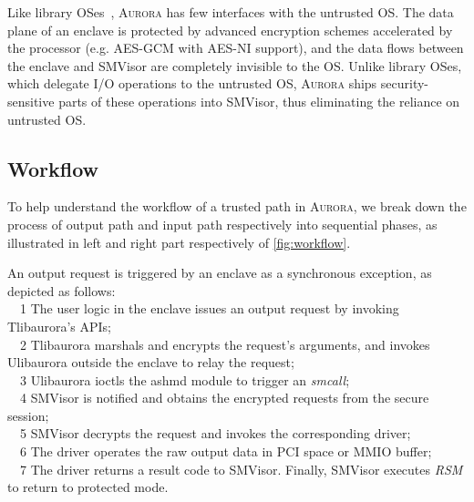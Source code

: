 Like library OSes~\cite{DBLP:journals/tocs/BaumannPH15, DBLP:conf/usenix/TsaiPV17, shinde_panoply:_2017}, \textsc{Aurora} has few interfaces with the untrusted OS. %
The data plane of an enclave is protected by advanced encryption schemes accelerated by the processor (e.g. AES-GCM with AES-NI support), and the data flows between the enclave and SMVisor are completely invisible to the OS. Unlike library OSes, which delegate I/O operations to the untrusted OS, \textsc{Aurora} ships security-sensitive parts of these operations into SMVisor, thus eliminating the reliance on untrusted OS.

\subsection{Workflow}\label{workflow}
To help understand the workflow of a trusted path in \textsc{Aurora}, we break down the process of output path and input path respectively into sequential phases, as illustrated in left and right part respectively of \autoref{fig:workflow}.

An output request is triggered by an enclave as a synchronous exception, as depicted as follows:\\
~~\textcircled{\footnotesize{1}} The user logic in the enclave issues an output request by invoking  Tlibaurora's APIs;\\
~~\textcircled{\footnotesize{2}} Tlibaurora marshals and encrypts the request's arguments, and invokes Ulibaurora outside the enclave to relay the request;\\ %
~~\textcircled{\footnotesize{3}} Ulibaurora ioctls the ashmd module to trigger an \textit{smcall};\\
~~\textcircled{\footnotesize{4}} SMVisor is notified and obtains the encrypted requests from the secure session;\\
~~\textcircled{\footnotesize{5}} SMVisor decrypts the request and invokes the corresponding  driver;\\
~~\textcircled{\footnotesize{6}} The driver operates the raw output data in PCI space or MMIO buffer;\\
~~\textcircled{\footnotesize{7}} The driver returns a result code to SMVisor. Finally, SMVisor  executes \textit{RSM} to return to protected mode. \\

